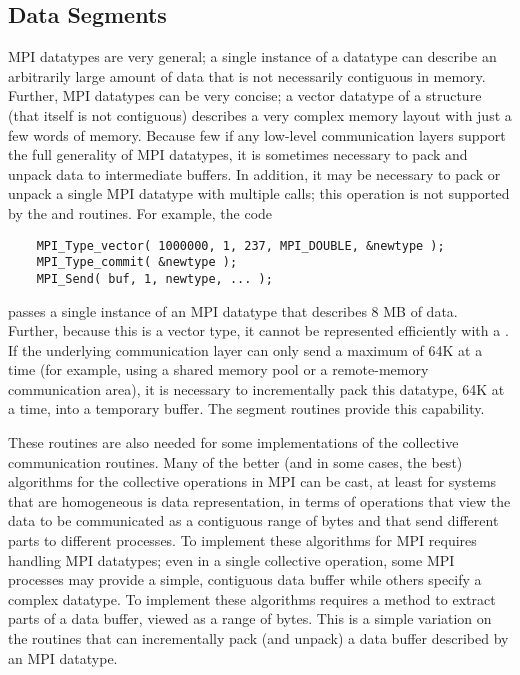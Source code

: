 \subsection{Data Segments}
\label{sec:segment}

MPI datatypes are very general; a single instance of a datatype can
describe an arbitrarily large amount of data that is not necessarily
contiguous in memory.  Further, MPI datatypes can be very concise;
a vector datatype of a structure (that itself is not contiguous)
describes a very complex memory layout with just a few words of
memory.  Because few if any low-level communication layers support the
full generality of MPI datatypes, it is sometimes necessary to pack
and unpack data to intermediate buffers.  In addition, it may be
necessary to pack or unpack a single MPI datatype with multiple calls;
this operation is not supported by the  and
 routines.  For example, the code
\begin{verbatim}
    MPI_Type_vector( 1000000, 1, 237, MPI_DOUBLE, &newtype );
    MPI_Type_commit( &newtype );
    MPI_Send( buf, 1, newtype, ... );
\end{verbatim}
passes a single instance of an MPI datatype that describes 8 MB of
data.  Further, because this is a vector type, it cannot be
represented efficiently with a .  If the
underlying communication layer can only send a maximum of 64K at a
time (for example, using a shared memory pool or a remote-memory
communication area), it is necessary to incrementally pack this
datatype, 64K at a time, into a temporary buffer.  The segment
routines provide this capability.

These routines are also needed for some implementations of the
collective communication routines.  Many of the better (and in some
cases, the best) algorithms for the collective operations in MPI can
be cast, at least for systems that are homogeneous is data
representation, in terms of operations that view the data to be
communicated as a contiguous range of bytes and that send different
parts to different processes.  To implement these algorithms for MPI
requires handling MPI datatypes; even in a single collective
operation, some MPI processes may provide a simple, contiguous data
buffer while others specify a complex datatype.  To implement these
algorithms requires a method to extract parts of a data buffer, viewed
as a range of bytes.  This is a simple variation on the routines that
can incrementally pack (and unpack) a data buffer described by an MPI
datatype.  



